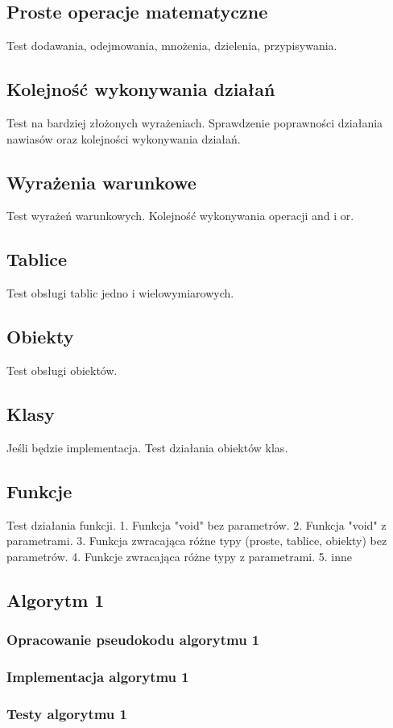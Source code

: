 \documentclass[a4paper]{article}
\begin{document}
\subsection{Proste operacje matematyczne}
Test dodawania, odejmowania, mnożenia, dzielenia, przypisywania.
\subsection{Kolejność wykonywania działań}
Test na bardziej złożonych wyrażeniach. Sprawdzenie poprawności działania nawiasów oraz kolejności wykonywania działań.
\subsection{Wyrażenia warunkowe}
Test wyrażeń warunkowych. Kolejność wykonywania operacji and i or.
\subsection{Tablice}
Test obsługi tablic jedno i wielowymiarowych.
\subsection{Obiekty}
Test obsługi obiektów.
\subsection{Klasy}
Jeśli będzie implementacja.
Test działania obiektów klas.
\subsection{Funkcje}
Test działania funkcji.
1. Funkcja "void" bez parametrów.
2. Funkcja "void" z parametrami.
3. Funkcja zwracająca różne typy (proste, tablice, obiekty) bez parametrów.
4. Funkcje zwracająca różne typy z parametrami.
5. inne

\subsection{Algorytm 1}
\subsubsection{Opracowanie pseudokodu algorytmu 1}
\subsubsection{Implementacja algorytmu 1}
\subsubsection{Testy algorytmu 1}
\end{document}
